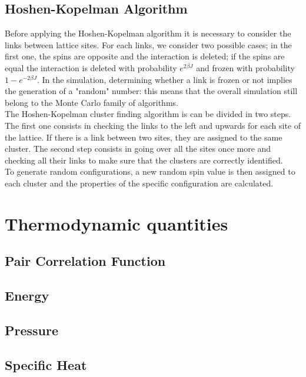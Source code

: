 \documentclass[twoside]{article}
\begin{document}
\begin{multicols}{2}
\subsection{Hoshen-Kopelman Algorithm}
Before applying the Hoshen-Kopelman algorithm it is necessary to consider the links between lattice sites. For each links, we consider two possible cases; in the first one, the spins are opposite and the interaction is deleted; if the spins are equal the interaction is deleted with probability $e^{2\beta J}$ and frozen with probability $1-e^{-2\beta J}$.
In the simulation, determining whether a link is frozen or not implies the generation of a "random" number: this means that the overall simulation still belong to the Monte Carlo family of algorithms. \\
The Hoshen-Kopelman cluster finding algorithm is can be divided in two steps.
The first one consists in checking the links to the left and upwards for each site of the lattice. If there is a link between two sites, they are assigned to the same cluster. The second step consists in going over all the sites once more and checking all their links to make sure that the clusters are correctly identified. \\ To generate random configurations, a new random spin value is then assigned to each cluster and the properties of the specific configuration are calculated.

\section{Thermodynamic quantities}

\subsection{Pair Correlation Function}

\subsection{Energy}

\subsection{Pressure}

\subsection{Specific Heat}


\end{multicols}
\end{document}
